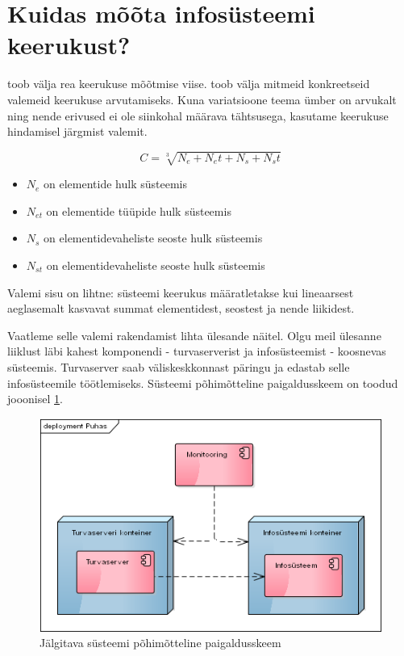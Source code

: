 \section{Kuidas mõõta infosüsteemi keerukust?}
\label{sec:complexity}
\cite{mitchell2009complexity} toob välja rea keerukuse mõõtmise viise. \citeauthor{crawley2015systems}\cite{crawley2015systems} toob välja mitmeid konkreetseid valemeid keerukuse arvutamiseks. Kuna variatsioone teema ümber on arvukalt ning nende erivused ei ole siinkohal määrava tähtsusega, kasutame keerukuse hindamisel järgmist valemit. 

\begin{equation}
	C = \sqrt[3]{N_e + N_et + N_s + N_st}
	\label{eq:complexity}
\end{equation}

\begin{itemize}
	\item $N_e$ on elementide hulk süsteemis
	\item $N_{et}$ on elementide tüüpide hulk süsteemis
	\item $N_s$ on elementidevaheliste seoste hulk süsteemis
	\item $N_{st}$ on elementidevaheliste seoste hulk süsteemis
\end{itemize}

Valemi sisu on lihtne: süsteemi keerukus määratletakse kui lineaarsest aeglasemalt kasvavat summat elementidest, seostest ja nende liikidest. 

Vaatleme selle valemi rakendamist lihta ülesande näitel. Olgu meil ülesanne liiklust läbi kahest komponendi - turvaserverist ja infosüsteemist - koosnevas süsteemis. Turvaserver saab väliskeskkonnast päringu ja edastab selle infosüsteemile töötlemiseks. Süsteemi põhimõtteline paigaldusskeem on toodud jooonisel \ref{fig:complexity:pure}.

\begin{figure}[htp]
	\begin{center}
		\includegraphics[width=.6\textwidth]{puhas.png}
		\caption{Jälgitava süsteemi põhimõtteline paigaldusskeem}
		\label{fig:complexity:pure}
	\end{center}
\end{figure}

